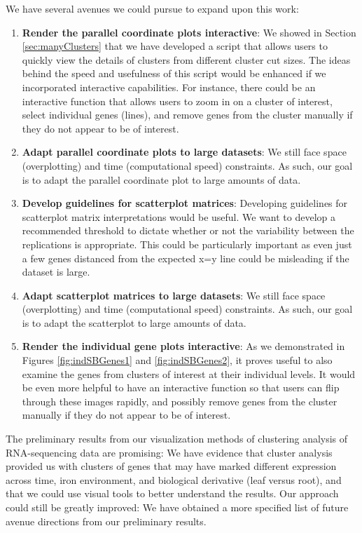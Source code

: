 \documentclass[11pt,a4paper,oldfontcommands,openany]{memoir}
\numberwithin{equation}{section} %
\begin{document}
We have several avenues we could pursue to expand upon this work:

\begin{enumerate}
\item \textbf{Render the parallel coordinate plots interactive}: We showed in Section \ref{sec:manyClusters} that we have developed a script that allows users to quickly view the details of clusters from different cluster cut sizes. The ideas behind the speed and usefulness of this script would be enhanced if we incorporated interactive capabilities. For instance, there could be an interactive function that allows users to zoom in on a cluster of interest, select individual genes (lines), and remove genes from the cluster manually if they do not appear to be of interest.

\item \textbf{Adapt parallel coordinate plots to large datasets}: We still face space (overplotting) and time (computational speed) constraints. As such, our goal is to adapt the parallel coordinate plot to large amounts of data.

\item \textbf{Develop guidelines for scatterplot matrices}: Developing guidelines for scatterplot matrix interpretations would be useful. We want to develop a recommended threshold to dictate whether or not the variability between the replications is appropriate. This could be particularly important as even just a few genes distanced from the expected x=y line could be misleading if the dataset is large.

\item \textbf{Adapt scatterplot matrices to large datasets}: We still face space (overplotting) and time (computational speed) constraints. As such, our goal is to adapt the scatterplot to large amounts of data.

\item \textbf{Render the individual gene plots interactive}: As we demonstrated in Figures \ref{fig:indSBGenes1} and \ref{fig:indSBGenes2}, it proves useful to also examine the genes from clusters of interest at their individual levels. It would be even more helpful to have an interactive function so that users can flip through these images rapidly, and possibly remove genes from the cluster manually if they do not appear to be of interest.

\end{enumerate}

The preliminary results from our visualization methods of clustering analysis of RNA-sequencing data are promising: We have evidence that cluster analysis provided us with clusters of genes that may have marked different expression across time, iron environment, and biological derivative (leaf versus root), and that we could use visual tools to better understand the results. Our approach could still be greatly improved: We have obtained a more specified list of future avenue directions from our preliminary results. 
\end{document}

